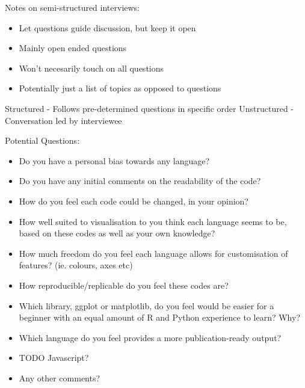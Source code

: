 Notes on semi-structured interviews:
\begin{itemize}
    \item Let questions guide discussion, but keep it open
    \item Mainly open ended questions
    \item Won't necesarily touch on all questions
    \item Potentially just a list of topics as opposed to questions
\end{itemize}

Structured - Follows pre-determined questions in specific order
Unstructured  - Conversation led by interviewee

Potential Questions: 
\begin{itemize}
    \item Do you have a personal bias towards any language?
    \item Do you have any initial comments on the readability of the code?
    \item How do you feel each code could be changed, in your opinion?
    \item How well suited to visualisation to you think each language seems to be, based on these codes as well as your own knowledge?
    \item How much freedom do you feel each language allows for customisation of features? (ie. colours, axes etc)
    \item How reproducible/replicable do you feel these codes are?
    \item Which library, ggplot or matplotlib, do you feel would be easier for a beginner with an equal amount of R and Python experience to learn? Why?
    \item Which language do you feel provides a more publication-ready output?
    \item TODO Javascript?
    \item Any other comments?
\end{itemize}